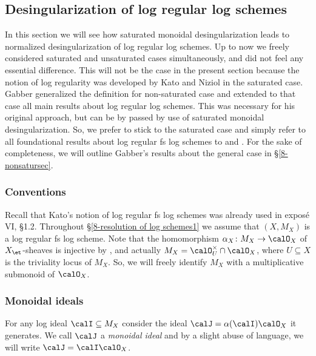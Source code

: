\documentclass[10pt]{../fichiers-configuration-latex/smfart}
\begin{document}
\subsection{Desingularization of log regular log
schemes}\label{8-resolution of log schemes1} In this section we will
see how saturated monoidal desingularization leads to normalized
desingularization of log regular log schemes. Up to now we freely
considered saturated and unsaturated cases simultaneously, and did
not feel any essential difference. This will not be the case in the
present section because the notion of log regularity was developed
by Kato and Niziol in the saturated case. Gabber generalized the
definition for non-saturated case and extended to that case all
main results about log regular log schemes. This was necessary for
his original approach, but can be by passed by use of saturated
monoidal desingularization. So, we prefer to stick to the saturated
case and simply refer to all foundational results about log regular
fs log schemes to \cite{Toric@Kato} and \cite{Toric@Niziol}. For
the sake of completeness, we will outline Gabber's results about
the general case in \S\ref{8-nonsatursec}.

\subsubsection{Conventions}\label{8-logregconvsec} Recall
that Kato's notion of log regular fs log schemes was already
used in expos\'e VI, \S1.2. Throughout \S\ref{8-resolution of
log schemes1} we assume that $(X,M_X)$ is a log regular fs log
scheme. Note that the homomorphism $\alpha_X{\colon}M_X\to\calO_X$
of $X_\et$-sheaves is injective by \cite[2.6]{Toric@Niziol}, and
actually $M_X=\calO^\times_U\cap\calO_X$, where $U\subseteq X$ is
the triviality locus of $M_X$. So, we will freely identify $M_X$
with a multiplicative submonoid of $\calO_X$.

\subsubsection{Monoidal ideals}\label{8-logregidealsec}
For any log ideal $\calI\subseteq M_X$ consider the ideal
$\calJ=\alpha(\calI)\calO_X$ it generates. We call $\calJ$ a {\em
monoidal ideal} and by a slight abuse of language, we will write
$\calJ=\calI\calO_X$.
\end{document}
